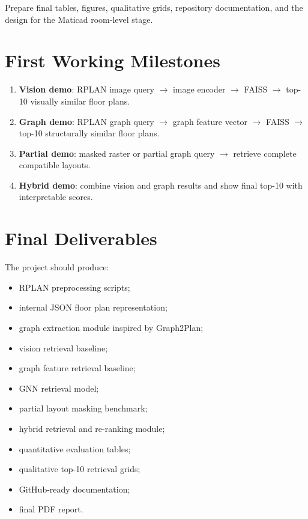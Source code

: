 \documentclass[11pt,a4paper]{article}
\begin{document}
Prepare final tables, figures, qualitative grids, repository documentation, and the design for the Maticad room-level stage.

\section{First Working Milestones}

\begin{enumerate}
    \item \textbf{Vision demo}: RPLAN image query $\rightarrow$ image encoder $\rightarrow$ FAISS $\rightarrow$ top-10 visually similar floor plans.
    \item \textbf{Graph demo}: RPLAN graph query $\rightarrow$ graph feature vector $\rightarrow$ FAISS $\rightarrow$ top-10 structurally similar floor plans.
    \item \textbf{Partial demo}: masked raster or partial graph query $\rightarrow$ retrieve complete compatible layouts.
    \item \textbf{Hybrid demo}: combine vision and graph results and show final top-10 with interpretable scores.
\end{enumerate}

\section{Final Deliverables}

The project should produce:
\begin{itemize}
    \item RPLAN preprocessing scripts;
    \item internal JSON floor plan representation;
    \item graph extraction module inspired by Graph2Plan;
    \item vision retrieval baseline;
    \item graph feature retrieval baseline;
    \item GNN retrieval model;
    \item partial layout masking benchmark;
    \item hybrid retrieval and re-ranking module;
    \item quantitative evaluation tables;
    \item qualitative top-10 retrieval grids;
    \item GitHub-ready documentation;
    \item final PDF report.
\end{itemize}
\end{document}
